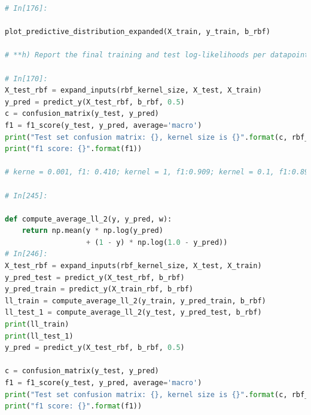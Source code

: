 \documentclass[journal]{IEEEtran}
\begin{document}
\begin{lstlisting}[language=Python]
# In[176]:

plot_predictive_distribution_expanded(X_train, y_train, b_rbf)

# **h) Report the final training and test log-likelihoods per datapoint, the 2x2 confusion matricies are generated for rbf kernel size = {0.01, 0.1, 1}**

# In[170]:
X_test_rbf = expand_inputs(rbf_kernel_size, X_test, X_train)
y_pred = predict_y(X_test_rbf, b_rbf, 0.5)
c = confusion_matrix(y_test, y_pred)
f1 = f1_score(y_test, y_pred, average='macro')  
print("Test set confusion matrix: {}, kernel size is {}".format(c, rbf_kernel_size))
print("f1 score: {}".format(f1))

# kerne = 0.001, f1: 0.410; kernel = 1, f1:0.909; kernel = 0.1, f1:0.896

# In[245]:

def compute_average_ll_2(y, y_pred, w):
    return np.mean(y * np.log(y_pred)
                   + (1 - y) * np.log(1.0 - y_pred)) 
# In[246]:
X_test_rbf = expand_inputs(rbf_kernel_size, X_test, X_train)
y_pred_test = predict_y(X_test_rbf, b_rbf)
y_pred_train = predict_y(X_train_rbf, b_rbf)
ll_train = compute_average_ll_2(y_train, y_pred_train, b_rbf)
ll_test_1 = compute_average_ll_2(y_test, y_pred_test, b_rbf)
print(ll_train)
print(ll_test_1)
y_pred = predict_y(X_test_rbf, b_rbf, 0.5)

c = confusion_matrix(y_test, y_pred)
f1 = f1_score(y_test, y_pred, average='macro')  
print("Test set confusion matrix: {}, kernel size is {}".format(c, rbf_kernel_size))
print("f1 score: {}".format(f1))
\end{lstlisting}
\end{document}
